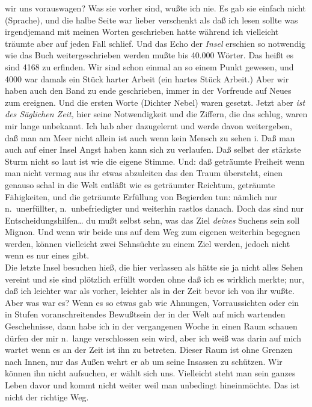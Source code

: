 \documentclass[
]{article}
\begin{document}
wir uns vorauswagen? Was sie vorher sind, wußte ich nie. Es gab sie
einfach nicht (Sprache), und die halbe Seite war lieber verschenkt als
daß ich lesen sollte was irgendjemand mit meinen Worten geschrieben
hatte während ich vielleicht träumte aber auf jeden Fall schlief. Und
das Echo der \emph{Insel} erschien so notwendig wie das Buch
weitergeschrieben werden mußte bis 40.000 Wörter. Das heißt es sind 4168
zu erfinden. Wir sind schon einmal an so einem Punkt gewesen, und 4000
war damals ein Stück harter Arbeit (ein hartes Stück Arbeit.) Aber wir
haben auch den Band zu ende geschrieben, immer in der Vorfreude auf
Neues zum ereignen. Und die ersten Worte (Dichter Nebel) waren gesetzt.
Jetzt aber \emph{ist des Säglichen Zeit,} hier seine Notwendigkeit und
die Ziffern, die das schlug, waren mir lange unbekannt. Ich hab aber
dazugelernt und werde davon weitergeben, daß man am Meer nicht allein
ist auch wenn kein Mensch zu sehen i. Daß man auch auf einer Insel Angst
haben kann sich zu verlaufen. Daß selbst der stärkste Sturm nicht so
laut ist wie die eigene Stimme. Und: daß geträumte Freiheit wenn man
nicht vermag aus ihr etwas abzuleiten das den Traum übersteht, einen
genauso schal in die Welt entläßt wie es geträumter Reichtum, geträumte
Fähigkeiten, und die geträumte Erfüllung von Begierden tun: nämlich nur
n.~unerfüllter, n.~unbefriedigter und weiterhin rastlos danach. Doch das
sind nur Entscheidungshilfen\ldots{} du mußt selbst sehn, was das Ziel
\emph{deines} Suchens sein soll Mignon. Und wenn wir beide uns auf dem
Weg zum eigenen weiterhin begegnen werden, können vielleicht zwei
Sehnsüchte zu einem Ziel werden, jedoch nicht wenn es nur eines gibt.\\
Die letzte Insel besuchen hieß, die hier verlassen als hätte sie ja
nicht alles Sehen vereint und sie sind plötzlich erfüllt worden ohne daß
ich es wirklich merkte; nur, daß ich leichter war als vorher, leichter
als in der Zeit bevor ich von ihr wußte. Aber was war es? Wenn es so
etwas gab wie Ahnungen, Vorraussichten oder ein in Stufen
voranschreitendes Bewußtsein der in der Welt auf mich wartenden
Geschehnisse, dann habe ich in der vergangenen Woche in einen Raum
schauen dürfen der mir n.~lange verschlossen sein wird, aber ich weiß
was darin auf mich wartet wenn es an der Zeit ist ihn zu betreten.
Dieser Raum ist ohne Grenzen nach Innen, nur das Außen wehrt er ab um
seine Insassen zu schützen. Wir können ihn nicht aufsuchen, er wählt
sich uns. Vielleicht steht man sein ganzes Leben davor und kommt nicht
weiter weil man unbedingt hineinmöchte. Das ist nicht der richtige Weg.
\end{document}
